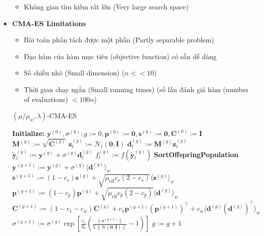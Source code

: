\documentclass{book}
\begin{document}
\begin{itemize}
\begin{itemize}
        \item Không gian tìm kiếm rất lớn (Very large search space)
    \end{itemize}
    \item \textbf{CMA-ES Limitations}
   \begin{itemize}
        \item Bài toán phân tách được một phần (Partly separable problem)
        \item Đạo hàm của hàm mục tiêu (objective function) có sẵn dễ dàng
        \item Số chiều nhỏ (Small dimension) ($n << 10$)
        \item Thời gian chạy ngắn (Small running times) (số lần đánh giá hàm (number of evaluations) $< 100n$)
    \end{itemize}
    \begin{algorithm}[H]
        \caption{$(\mu/\mu_w, \lambda)$-CMA-ES}
        \begin{algorithmic}[1]
            \STATE \textbf{Initialize:} $\mathbf{y}^{(0)}, \sigma^{(0)}; g := 0, \mathbf{p}^{(0)} := \mathbf{0}, \mathbf{s}^{(0)} := \mathbf{0}, \mathbf{C}^{(0)} := \mathbf{I}$
            \REPEAT
            \STATE $\mathbf{M}^{(g)} := \sqrt{\mathbf{C}^{(g)}}$
            \STATE $\mathbf{z}_l^{(g)} := \mathcal{N}_l(\mathbf{0}, \mathbf{I})$
            \STATE $\mathbf{d}_l^{(g)} := \mathbf{M}^{(g)} \mathbf{z}_l^{(g)}$
            \STATE $\tilde{\mathbf{y}}_l^{(g)} := \mathbf{y}^{(g)} + \sigma^{(g)} \mathbf{d}_l^{(g)}$
            \STATE $f_l^{(g)} := f(\tilde{\mathbf{y}}_l^{(g)})$
            \ENDFOR
            \STATE \textbf{SortOffspringPopulation}
            \STATE $\mathbf{y}^{(g+1)} := \mathbf{y}^{(g)} + \sigma^{(g)} \langle \mathbf{d}^{(g)} \rangle_w$
            \STATE $\mathbf{s}^{(g+1)} := (1 - c_s)\mathbf{s}^{(g)} + \sqrt{\mu_{\operatorname{eff}} c_s(2 - c_s)} \langle \mathbf{z}^{(g)} \rangle_w$
            \STATE $\mathbf{p}^{(g+1)} := (1 - c_p)\mathbf{p}^{(g)} + \sqrt{\mu_{\operatorname{eff}} c_p(2 - c_p)} \langle \mathbf{d}^{(g)} \rangle_w$
            \STATE $\mathbf{C}^{(g+1)} := (1 - c_1 - c_w)\mathbf{C}^{(g)} + c_1 \mathbf{p}^{(g+1)} (\mathbf{p}^{(g+1)})^\top + c_w \langle \mathbf{d}^{(g)} (\mathbf{d}^{(g)})^\top \rangle_w$
            \STATE $\sigma^{(g+1)} := \sigma^{(g)} \exp \left[ \frac{c_s}{d_\sigma} \left( \frac{\|\mathbf{s}^{(g+1)}\|}{\mathbb{E}\|\mathcal{N}(\mathbf{0}, \mathbf{I})\|} - 1 \right) \right]$
            \STATE $g := g + 1$

\end{algorithmic}
\end{algorithm}
\end{itemize}
\end{document}
